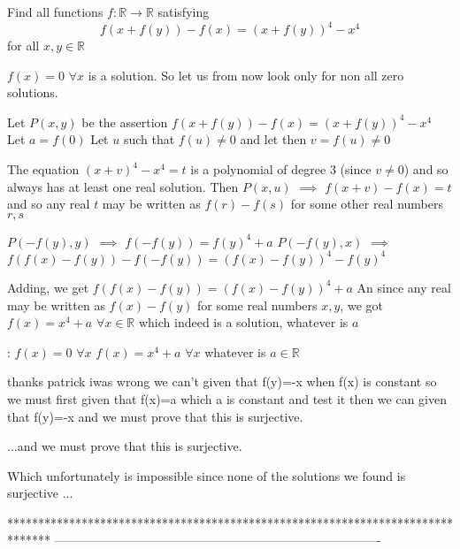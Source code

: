 \begin{solution}
	\begin{tcolorbox}Find all functions $f: \mathbb{R} \to \mathbb{R}$ satisfying
\[f(x+f(y))-f(x)=(x+f(y))^4-x^4\]
for all $x,y \in \mathbb{R}$\end{tcolorbox}
$f(x)=0$ $\forall x$ is a solution. So let us from now look only for non all zero solutions.

Let $P(x,y)$ be the assertion $f(x+f(y))-f(x)=(x+f(y))^4-x^4$
Let $a=f(0)$
Let $u$ such that $f(u)\ne 0$ and let then $v=f(u)\ne 0$

The equation $(x+v)^4-x^4=t$ is a polynomial of degree $3$ (since $v\ne 0$) and so always has at least one real solution.
Then $P(x,u)$ $\implies$ $f(x+v)-f(x)=t$ and so any real $t$ may be written as $f(r)-f(s)$ for some other real numbers $r,s$

$P(-f(y),y)$ $\implies$ $f(-f(y))=f(y)^4+a$
$P(-f(y),x)$ $\implies$ $f(f(x)-f(y))-f(-f(y))=(f(x)-f(y))^4-f(y)^4$
 
Adding, we get $f(f(x)-f(y))=(f(x)-f(y))^4+a$
An since any real may be written as $f(x)-f(y)$ for some real numbers $x,y$, we got $f(x)=x^4+a$ $\forall x\in\mathbb R$ which indeed is a solution, whatever is $a$

 :
$f(x)=0$ $\forall x$
$f(x)=x^4+a$ $\forall x$ whatever is $a\in\mathbb R$
\end{solution}



\begin{solution}
	thanks patrick iwas wrong we can't given that f(y)=-x when f(x) is constant so we must first given that f(x)=a which a is constant  and test it then we can given that f(y)=-x and we must prove that this is surjective.
\end{solution}



\begin{solution}
	\begin{tcolorbox}...and we must prove that this is surjective.\end{tcolorbox}
Which unfortunately is impossible since none of the solutions we found is surjective ...
\end{solution}
*******************************************************************************
-------------------------------------------------------------------------------

